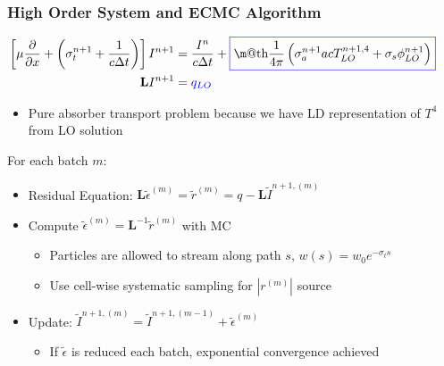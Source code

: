 \documentclass[xcolor=dvipsnames,hyperref={pdfpagelabels=false},unknownkeysallowed]{beamer}
\makeatletter
\newcommand*{\boxedcolor}{blue}
\renewcommand{\boxed}[1]{\textcolor{\boxedcolor}{%
  \fbox{\normalcolor\m@th$\displaystyle#1$}}}
\newcommand{\colb}[1]{{\color{blue} #1}}
\newlength{\wideitemsep}
\let\olditem\item
\renewcommand{\item}{\setlength{\itemsep}{\wideitemsep}\olditem}
\newcommand{\pderiv}[2]{\frac{\partial #1}{\partial #2}}
\newcommand{\B}[1]{\ensuremath{\mathbf{#1}}}
\makeatother
\begin{document}
\begin{frame}
    \frametitle{High Order System and ECMC Algorithm}
        \begin{align*}
            \hspace{-0.2in}
            \left[\mu \pderiv{}{x} + \left(\sigma_t^{n+1}+\frac{1}{c\Delta t}\right)\right]I^{n+1}
            &= \frac{I^{n}}{c\Delta t} + \boxed{\frac{1}{4\pi}\left(\sigma_a^{n+1} a c
    T_{LO}^{n+1,4}+\sigma_s\phi_{LO}^{n+1}\right)} \\
            \B L I^{n+1} &= \colb{q_{LO}}
     \end{align*}
    \begin{itemize}
        \item \colb{Pure absorber} transport problem because we have LD
            representation of $T^4$ from LO solution
        \vspace{-0.3in}
        
        \end{itemize}
        \begin{block}{For each batch $m$:}
         \begin{itemize}
        \item Residual Equation: $\displaystyle \B L \tilde 
            \epsilon^{(m)} =
            \tilde r^{(m)} = q - \B L \tilde I^{n+1,(m)}$
        \item Compute $\tilde{\epsilon}^{(m)} = \B L^{-1} \tilde{r}^{(m)}$ with MC 
            \begin{itemize}
                \item Particles are allowed to stream along path $s$, $w(s)=w_0 e^{-\sigma_t s}$
                \item Use cell-wise {systematic} sampling for $|r^{(m)}|$ source
            \end{itemize}
        \item Update: $\tilde I^{n+1,(m)} = \tilde I^{n+1,(m-1)} + \tilde \epsilon^{(m)}$
        \begin{itemize}
            \item If $\tilde{\epsilon}$ is reduced each batch, \colb{exponential convergence
                achieved}
        \end{itemize}
    \end{itemize}
\end{block}
\end{frame}
\end{document}
